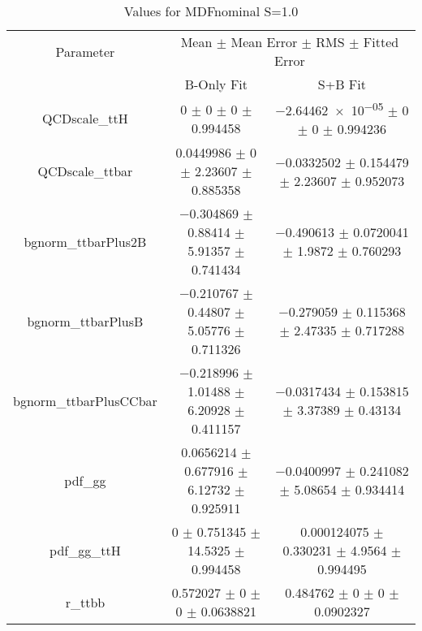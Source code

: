 \begin{table}
\centering
\caption{Values for MDFnominal S=1.0}
\begin{tabular}{ccc}
\toprule
Parameter & \multicolumn{2}{c}{Mean $\pm$ Mean Error $\pm$ RMS $\pm$ Fitted Error}\\
 & B-Only Fit & S+B Fit\\
\midrule
QCDscale\_ttH & \num{0} $\pm$ \num{0} $\pm$ \num{0} $\pm$ \num{0.994458} & \num{-2.64462e-05} $\pm$ \num{0} $\pm$ \num{0} $\pm$ \num{0.994236}\\
QCDscale\_ttbar & \num{0.0449986} $\pm$ \num{0} $\pm$ \num{2.23607} $\pm$ \num{0.885358} & \num{-0.0332502} $\pm$ \num{0.154479} $\pm$ \num{2.23607} $\pm$ \num{0.952073}\\
bgnorm\_ttbarPlus2B & \num{-0.304869} $\pm$ \num{0.88414} $\pm$ \num{5.91357} $\pm$ \num{0.741434} & \num{-0.490613} $\pm$ \num{0.0720041} $\pm$ \num{1.9872} $\pm$ \num{0.760293}\\
bgnorm\_ttbarPlusB & \num{-0.210767} $\pm$ \num{0.44807} $\pm$ \num{5.05776} $\pm$ \num{0.711326} & \num{-0.279059} $\pm$ \num{0.115368} $\pm$ \num{2.47335} $\pm$ \num{0.717288}\\
bgnorm\_ttbarPlusCCbar & \num{-0.218996} $\pm$ \num{1.01488} $\pm$ \num{6.20928} $\pm$ \num{0.411157} & \num{-0.0317434} $\pm$ \num{0.153815} $\pm$ \num{3.37389} $\pm$ \num{0.43134}\\
pdf\_gg & \num{0.0656214} $\pm$ \num{0.677916} $\pm$ \num{6.12732} $\pm$ \num{0.925911} & \num{-0.0400997} $\pm$ \num{0.241082} $\pm$ \num{5.08654} $\pm$ \num{0.934414}\\
pdf\_gg\_ttH & \num{0} $\pm$ \num{0.751345} $\pm$ \num{14.5325} $\pm$ \num{0.994458} & \num{0.000124075} $\pm$ \num{0.330231} $\pm$ \num{4.9564} $\pm$ \num{0.994495}\\
r\_ttbb & \num{0.572027} $\pm$ \num{0} $\pm$ \num{0} $\pm$ \num{0.0638821} & \num{0.484762} $\pm$ \num{0} $\pm$ \num{0} $\pm$ \num{0.0902327}\\
\bottomrule
\end{tabular}
\end{table}